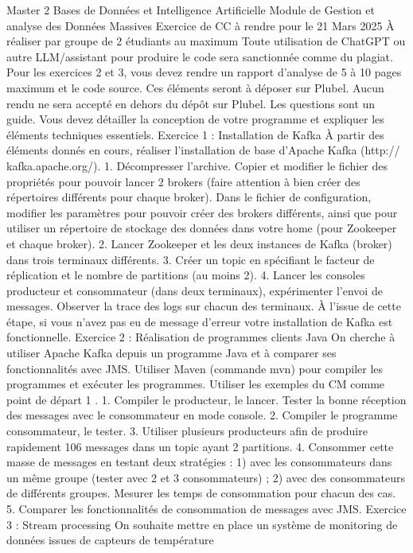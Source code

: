 Master 2 Bases de Données et Intelligence Artificielle
Module de Gestion et analyse des Données Massives
Exercice de CC à rendre pour le 21 Mars 2025
À réaliser par groupe de 2 étudiants au maximum
Toute utilisation de ChatGPT ou autre LLM/assistant pour produire le code sera sanctionnée comme
du plagiat.
Pour les exercices 2 et 3, vous devez rendre un rapport d’analyse de 5 à 10 pages maximum et
le code source. Ces éléments seront à déposer sur Plubel. Aucun rendu ne sera accepté en dehors du
dépôt sur Plubel. Les questions sont un guide. Vous devez détailler la conception de votre programme
et expliquer les éléments techniques essentiels.
Exercice 1 : Installation de Kafka
À partir des éléments donnés en cours, réaliser l’installation de base d’Apache Kafka (http://
kafka.apache.org/).
1. Décompresser l’archive. Copier et modifier le fichier des propriétés pour pouvoir lancer 2 brokers
(faire attention à bien créer des répertoires différents pour chaque broker). Dans le fichier de
configuration, modifier les paramètres pour pouvoir créer des brokers différents, ainsi que pour
utiliser un répertoire de stockage des données dans votre home (pour Zookeeper et chaque
broker).
2. Lancer Zookeeper et les deux instances de Kafka (broker) dans trois terminaux différents.
3. Créer un topic en spécifiant le facteur de réplication et le nombre de partitions (au moins 2).
4. Lancer les consoles producteur et consommateur (dans deux terminaux), expérimenter l’envoi
de messages. Observer la trace des logs sur chacun des terminaux.
À l’issue de cette étape, si vous n’avez pas eu de message d’erreur votre installation de Kafka est
fonctionnelle.
Exercice 2 : Réalisation de programmes clients Java
On cherche à utiliser Apache Kafka depuis un programme Java et à comparer ses fonctionnalités
avec JMS. Utiliser Maven (commande mvn) pour compiler les programmes et exécuter les programmes.
Utiliser les exemples du CM comme point de départ 1
.
1. Compiler le producteur, le lancer. Tester la bonne réception des messages avec le consommateur
en mode console.
2. Compiler le programme consommateur, le tester.
3. Utiliser plusieurs producteurs afin de produire rapidement 106 messages dans un topic ayant 2
partitions.
4. Consommer cette masse de messages en testant deux stratégies : 1) avec les consommateurs dans
un même groupe (tester avec 2 et 3 consommateurs) ; 2) avec des consommateurs de différents
groupes. Mesurer les temps de consommation pour chacun des cas.
5. Comparer les fonctionnalités de consommation de messages avec JMS.
Exercice 3 : Stream processing
On souhaite mettre en place un système de monitoring de données issues de capteurs de température
